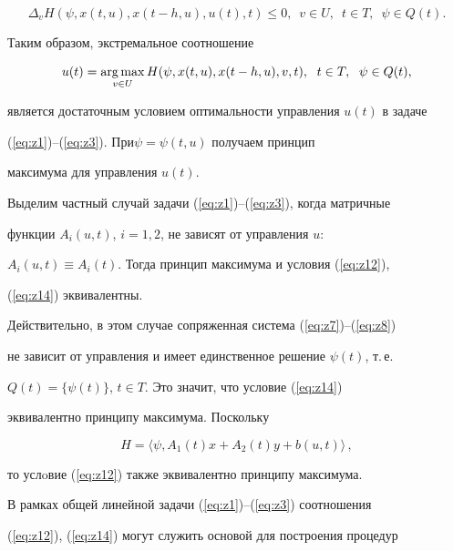 $$


\Delta_vH(\psi,x(t,u),x(t-h,u),u(t),t)\leq 0,\ \;v\in U,\ \;t\in


T,\ \;\psi\in Q(t).


$$


Таким образом, экстремальное соотношение


\begin{equation}


u(t)=\argmax_{v\in U}H(\psi,x(t,u),x(t-h,u),v,t),\ \;t\in


T,\ \;\psi\in Q(t),


\label{eq:z14}


\end{equation}


является достаточным условием оптимальности управления $u(t)$ в задаче


(\ref{eq:z1})--(\ref{eq:z3}). При\linebreak $\psi=\psi(t,u)$ получаем принцип


максимума для управления $u(t)$.





Выделим частный случай задачи (\ref{eq:z1})--(\ref{eq:z3}), когда матричные


функции $A_i(u,t)$, $i={1,2}$, не зависят от управления $u$:


$A_i(u,t)\equiv A_i(t)$. Тогда принцип максимума и условия (\ref{eq:z12}),


(\ref{eq:z14}) эквивалентны.


Действительно, в этом случае сопряженная система (\ref{eq:z7})--(\ref{eq:z8})


не зависит от управления и имеет единственное решение $\psi(t)$, т.\,е.


$Q(t)=\{\psi(t)\}$, $t\in T$. Это значит, что условие (\ref{eq:z14})


эквивалентно принципу максимума. Поскольку


$$


H=\langle \psi,A_1(t)x+A_2(t)y+b(u,t)\rangle\,,


$$


то услoвие (\ref{eq:z12}) также эквивалентно принципу максимума.





В рамках общей линейной задачи (\ref{eq:z1})--(\ref{eq:z3}) соотношения


(\ref{eq:z12}), (\ref{eq:z14}) могут служить основой для построения процедур


